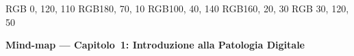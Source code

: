 
\definecolor{cDef} {RGB}{  0, 120, 110}
\definecolor{cWSI} {RGB}{180,  70,  10}
\definecolor{cFmt} {RGB}{100,  40, 140}
\definecolor{cIT}  {RGB}{160,  20,  30}
\definecolor{cOSS} {RGB}{ 30, 120,  50}


\begin{center}
  {\large\bfseries Mind-map ---
   Capitolo~1: Introduzione alla Patologia Digitale}
\end{center}

\vspace{-2pt}

